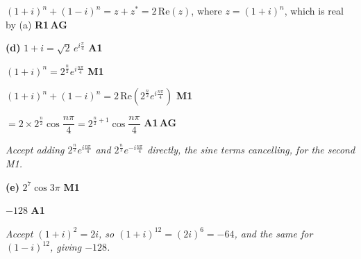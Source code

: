\documentclass[12pt, twoside]{article}
\begin{document}
\begin{enumerate}[itemsep=0.3cm]
$(1 + i)^{n} + (1 - i)^{n} = z + z^{*} = 2\,\mathrm{Re}(z)$, where
$z = (1 + i)^{n}$, which is real by (a) \hfill \textbf{R1}\,\textbf{AG}

\textbf{(d)} $1 + i = \sqrt{2}\,e^{i\frac{\pi}{4}}$ \hfill \textbf{A1}

$(1 + i)^{n} = 2^{\frac{n}{2}}e^{i\frac{n\pi}{4}}$ \hfill \textbf{M1}

$(1 + i)^{n} + (1 - i)^{n} = 2\,\mathrm{Re}\left(2^{\frac{n}{2}}e^{i\frac{n\pi}{4}}\right)$
\hfill \textbf{M1}

$= 2 \times 2^{\frac{n}{2}}\cos\dfrac{n\pi}{4} = 2^{\frac{n}{2} + 1}\cos\dfrac{n\pi}{4}$
\hfill \textbf{A1}\,\textbf{AG}

\emph{Accept adding $2^{\frac{n}{2}}e^{i\frac{n\pi}{4}}$ and
$2^{\frac{n}{2}}e^{-i\frac{n\pi}{4}}$ directly, the sine terms cancelling,
for the second M1.}

\textbf{(e)} $2^{7}\cos 3\pi$ \hfill \textbf{M1}

$-128$ \hfill \textbf{A1}

\emph{Accept $(1 + i)^{2} = 2i$, so $(1 + i)^{12} = (2i)^{6} = -64$, and the
same for $(1 - i)^{12}$, giving $-128$.}

\end{enumerate}
\end{document}
